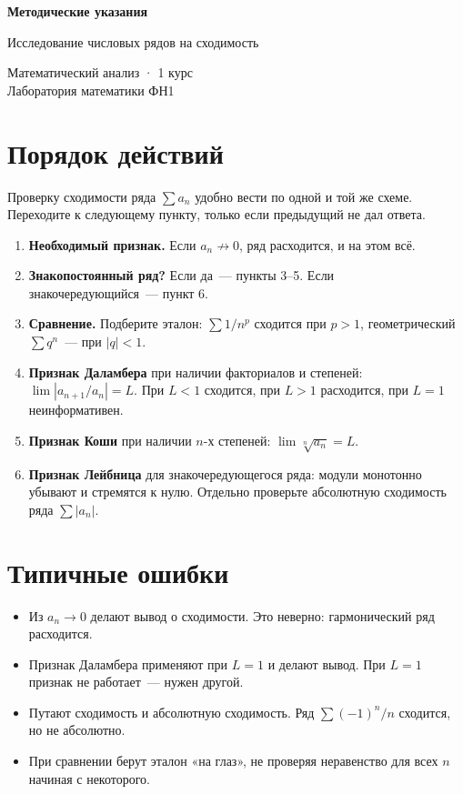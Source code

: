 \documentclass[12pt, a4paper]{article}
\begin{document}
\begin{center}
  {\large\bfseries Методические указания}

  \vspace{0.3em}
  {\large Исследование числовых рядов на сходимость}

  \vspace{0.5em}
  {\small Математический анализ · 1 курс\\ Лаборатория математики ФН1}
\end{center}
\vspace{1em}

\section*{Порядок действий}

Проверку сходимости ряда $\sum a_n$ удобно вести по одной и той же схеме.
Переходите к следующему пункту, только если предыдущий не дал ответа.

\begin{enumerate}[nosep]
  \item \textbf{Необходимый признак.} Если $a_n \not\to 0$, ряд расходится, и на этом всё.
  \item \textbf{Знакопостоянный ряд?} Если да~--- пункты 3--5. Если знакочередующийся~--- пункт 6.
  \item \textbf{Сравнение.} Подберите эталон: $\sum 1/n^p$ сходится при $p>1$,
        геометрический $\sum q^n$~--- при $|q|<1$.
  \item \textbf{Признак Даламбера} при наличии факториалов и степеней:
        $\lim |a_{n+1}/a_n| = L$. При $L<1$ сходится, при $L>1$ расходится, при $L=1$ неинформативен.
  \item \textbf{Признак Коши} при наличии $n$-х степеней: $\lim \sqrt[n]{a_n} = L$.
  \item \textbf{Признак Лейбница} для знакочередующегося ряда: модули монотонно убывают и стремятся к нулю.
        Отдельно проверьте абсолютную сходимость ряда $\sum |a_n|$.
\end{enumerate}

\section*{Типичные ошибки}

\begin{itemize}[nosep]
  \item Из $a_n \to 0$ делают вывод о сходимости. Это неверно: гармонический ряд расходится.
  \item Признак Даламбера применяют при $L=1$ и делают вывод. При $L=1$ признак не работает~---
        нужен другой.
  \item Путают сходимость и абсолютную сходимость. Ряд $\sum (-1)^n/n$ сходится, но не абсолютно.
  \item При сравнении берут эталон «на глаз», не проверяя неравенство для всех $n$ начиная с некоторого.
\end{itemize}
\end{document}
